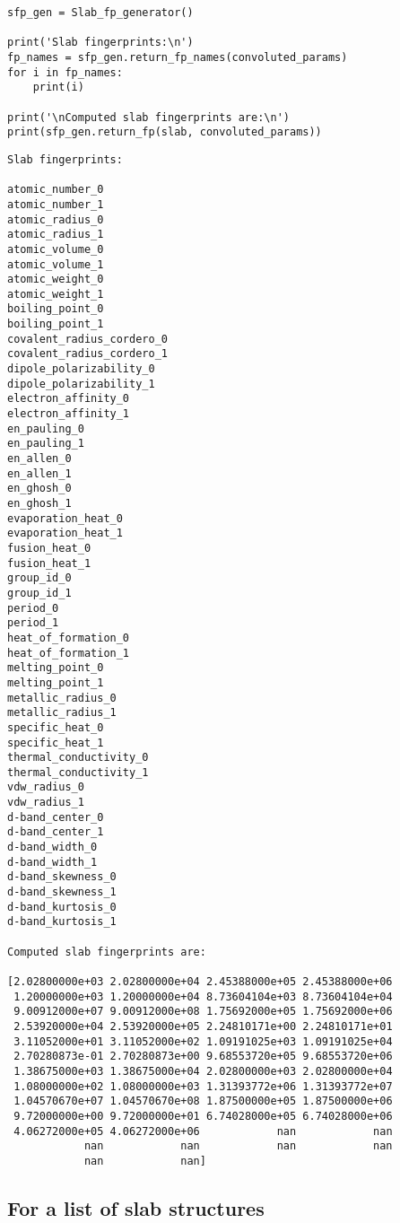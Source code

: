 \documentclass[11pt]{article}
\begin{document}
\begin{verbatim}
sfp_gen = Slab_fp_generator()

print('Slab fingerprints:\n')
fp_names = sfp_gen.return_fp_names(convoluted_params)
for i in fp_names:
    print(i)

print('\nComputed slab fingerprints are:\n')
print(sfp_gen.return_fp(slab, convoluted_params))

\end{verbatim}

\begin{verbatim}
Slab fingerprints:

atomic_number_0
atomic_number_1
atomic_radius_0
atomic_radius_1
atomic_volume_0
atomic_volume_1
atomic_weight_0
atomic_weight_1
boiling_point_0
boiling_point_1
covalent_radius_cordero_0
covalent_radius_cordero_1
dipole_polarizability_0
dipole_polarizability_1
electron_affinity_0
electron_affinity_1
en_pauling_0
en_pauling_1
en_allen_0
en_allen_1
en_ghosh_0
en_ghosh_1
evaporation_heat_0
evaporation_heat_1
fusion_heat_0
fusion_heat_1
group_id_0
group_id_1
period_0
period_1
heat_of_formation_0
heat_of_formation_1
melting_point_0
melting_point_1
metallic_radius_0
metallic_radius_1
specific_heat_0
specific_heat_1
thermal_conductivity_0
thermal_conductivity_1
vdw_radius_0
vdw_radius_1
d-band_center_0
d-band_center_1
d-band_width_0
d-band_width_1
d-band_skewness_0
d-band_skewness_1
d-band_kurtosis_0
d-band_kurtosis_1

Computed slab fingerprints are:

[2.02800000e+03 2.02800000e+04 2.45388000e+05 2.45388000e+06
 1.20000000e+03 1.20000000e+04 8.73604104e+03 8.73604104e+04
 9.00912000e+07 9.00912000e+08 1.75692000e+05 1.75692000e+06
 2.53920000e+04 2.53920000e+05 2.24810171e+00 2.24810171e+01
 3.11052000e+01 3.11052000e+02 1.09191025e+03 1.09191025e+04
 2.70280873e-01 2.70280873e+00 9.68553720e+05 9.68553720e+06
 1.38675000e+03 1.38675000e+04 2.02800000e+03 2.02800000e+04
 1.08000000e+02 1.08000000e+03 1.31393772e+06 1.31393772e+07
 1.04570670e+07 1.04570670e+08 1.87500000e+05 1.87500000e+06
 9.72000000e+00 9.72000000e+01 6.74028000e+05 6.74028000e+06
 4.06272000e+05 4.06272000e+06            nan            nan
            nan            nan            nan            nan
            nan            nan]
\end{verbatim}

\subsection{For a list of slab structures}
\label{sec:org5828b5b}
\end{document}
